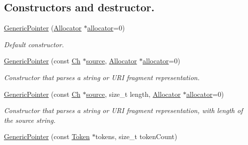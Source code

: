 \subsection*{Constructors and destructor.}
\begin{DoxyCompactItemize}
\item 
\mbox{\hyperlink{classrapidjson_1_1_generic_pointer_aa077ce171ea25cf501c12f2d5df7f248}{Generic\+Pointer}} (\mbox{\hyperlink{classrapidjson_1_1_allocator}{Allocator}} $\ast$\mbox{\hyperlink{classrapidjson_1_1_generic_pointer_a3e671447cf032271956fa984aad23ef7}{allocator}}=0)
\begin{DoxyCompactList}\small\item\em Default constructor. \end{DoxyCompactList}\item 
\mbox{\hyperlink{classrapidjson_1_1_generic_pointer_a8f831aae14afc493a82b5fb6aa9c3c43}{Generic\+Pointer}} (const \mbox{\hyperlink{classrapidjson_1_1_generic_pointer_a850f78846c5548565f8395be5f3427b7}{Ch}} $\ast$\mbox{\hyperlink{namespacerapidjson_a37a3d95ab06aa7542487bb76e704885c}{source}}, \mbox{\hyperlink{classrapidjson_1_1_allocator}{Allocator}} $\ast$\mbox{\hyperlink{classrapidjson_1_1_generic_pointer_a3e671447cf032271956fa984aad23ef7}{allocator}}=0)
\begin{DoxyCompactList}\small\item\em Constructor that parses a string or U\+RI fragment representation. \end{DoxyCompactList}\item 
\mbox{\hyperlink{classrapidjson_1_1_generic_pointer_a00ad17ea227d2556404df7cc64c6aeb5}{Generic\+Pointer}} (const \mbox{\hyperlink{classrapidjson_1_1_generic_pointer_a850f78846c5548565f8395be5f3427b7}{Ch}} $\ast$\mbox{\hyperlink{namespacerapidjson_a37a3d95ab06aa7542487bb76e704885c}{source}}, size\+\_\+t length, \mbox{\hyperlink{classrapidjson_1_1_allocator}{Allocator}} $\ast$\mbox{\hyperlink{classrapidjson_1_1_generic_pointer_a3e671447cf032271956fa984aad23ef7}{allocator}}=0)
\begin{DoxyCompactList}\small\item\em Constructor that parses a string or U\+RI fragment representation, with length of the source string. \end{DoxyCompactList}\item 
\mbox{\hyperlink{classrapidjson_1_1_generic_pointer_a6df9f6a01d1b5945811055e1cf8aead6}{Generic\+Pointer}} (const \mbox{\hyperlink{structrapidjson_1_1_generic_pointer_1_1_token}{Token}} $\ast$tokens, size\+\_\+t token\+Count)

\end{DoxyCompactItemize}

